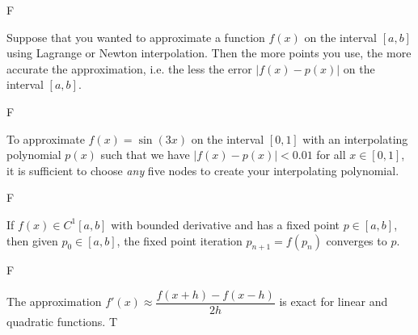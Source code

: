 \documentclass[11pt,letterpaper]{article}
\begin{document}
F


Suppose that you wanted to approximate a function $f(x)$ on the interval $[a, b]$ using Lagrange or Newton interpolation. Then the more points you use, the more accurate the approximation, i.e. the less the error $|f(x) - p(x)|$ on the interval $[a, b]$. 

F



To approximate $f(x)= \sin(3x)$ on the interval $[0, 1]$ with an interpolating polynomial $p(x)$ such that we have $|f(x) - p(x)| < 0.01$ for all $x \in [0, 1]$, it is sufficient to choose \textit{any} five nodes to create your interpolating polynomial. 

F


If $f(x) \in C^1[a, b]$ with bounded derivative and has a fixed point $p \in [a, b]$, then given $p_0 \in [a, b]$, the fixed point iteration $p_{n+1}= f(p_n)$ converges to $p$. 

F


The approximation $f'(x) \approx \dfrac{f(x + h) - f(x - h)}{2h}$ is exact for linear and quadratic functions. 
T
\end{document}
